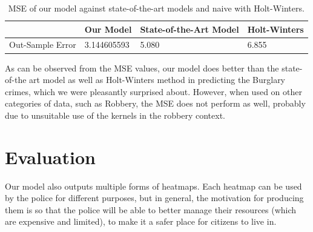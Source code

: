 \documentclass[letterpaper]{article}
\begin{document}
	\begin{table}[!ht]
		\begin{tabular}{| p{1cm} | l | p{2cm} | p{1.5cm} | }
		\hline
		& Our Model & State-of-the-Art Model & Holt-Winters \\ \hline
		Out-Sample Error & 3.144605593 & 5.080 & 6.855\\
		\hline
		\end{tabular}
		\caption{MSE of our model against state-of-the-art models and naive with Holt-Winters.}
		\label{t2}
	\end{table}

	As can be observed from the MSE values, our model does better than the state-of-the art model as well as Holt-Winters method in predicting the Burglary crimes, which we were pleasantly surprised about. However, when used on other categories of data, such as Robbery, the MSE does not perform as well, probably due to unsuitable use of the kernels in the robbery context.
	
	\section{Evaluation}
	Our model also outputs multiple forms of heatmaps. Each heatmap can be used by the police for different purposes, but in general, the motivation for producing them is so that the police will be able to better manage their resources (which are expensive and limited), to make it a safer place for citizens to live in.
\end{document}
